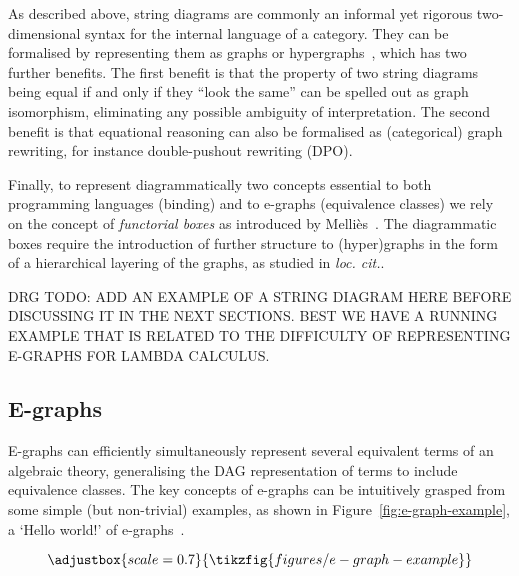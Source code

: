 \documentclass[peerreviewcls]{IEEEtran}
\begin{document}
As described above, string diagrams are commonly an informal yet rigorous two-dimensional syntax for the internal language of a category. 
They can be formalised by representing them as graphs or hypergraphs~\cite{https://dl.acm.org/doi/full/10.1145/3502719}, which has two further benefits. 
The first benefit is that the property of two string diagrams being equal if and only if they ``look the same'' can be spelled out as graph isomorphism, eliminating any possible ambiguity of interpretation. 
The second benefit is that equational reasoning can also be formalised as (categorical) graph rewriting, for instance double-pushout rewriting (DPO). 

Finally, to represent diagrammatically two concepts essential to both programming languages (binding) and to e-graphs (equivalence classes) we rely on the concept of \emph{functorial boxes} as introduced by Melli\`es~\cite{https://link.springer.com/chapter/10.1007/11874683_1}. 
The diagrammatic boxes require the introduction of further structure to (hyper)graphs in the form of a hierarchical layering of the graphs, as studied in \emph{loc. cit.}.

DRG TODO: ADD AN EXAMPLE OF A STRING DIAGRAM HERE BEFORE DISCUSSING IT IN THE NEXT SECTIONS. BEST WE HAVE A RUNNING EXAMPLE THAT IS RELATED TO THE DIFFICULTY OF REPRESENTING E-GRAPHS FOR LAMBDA CALCULUS. 

\subsection{E-graphs}

E-graphs can efficiently simultaneously represent several equivalent terms of an algebraic theory, generalising the DAG representation of terms to include equivalence classes.
The key concepts of e-graphs can be intuitively grasped from some simple (but non-trivial) examples, as shown in Figure~\ref{fig:e-graph-example}, a `Hello world!' of e-graphs~\cite{EggPaper}.

\begin{figure*}
\[
\adjustbox{scale=0.7}{
\tikzfig{figures/e-graph-example}
}
\]
\caption{E-graph example (top) and its equivalent string diagram representation (bottom)}
\label{fig:e-graph-example}
\end{figure*}
\end{document}
